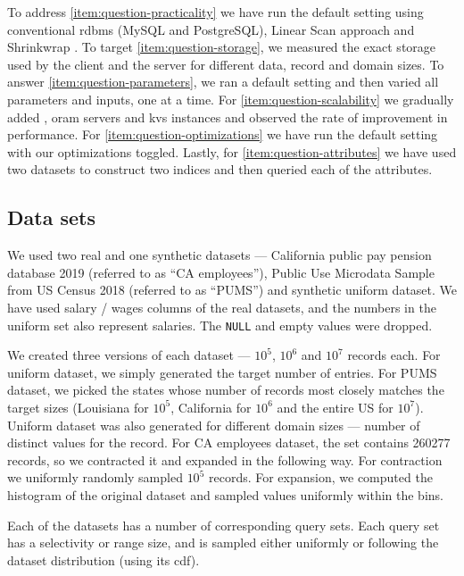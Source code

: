	To address \ref{item:question-practicality} we have run the default setting using conventional \acrshort{rdbms} (MySQL and PostgreSQL), Linear Scan approach and Shrinkwrap \cite{shrinkwrap}. %
	To target \ref{item:question-storage}, we measured the exact storage used by the client and the server for different data, record and domain sizes. %
	To answer \ref{item:question-parameters}, we ran a default setting and then varied all parameters and inputs, one at a time. %
	For \ref{item:question-scalability} we gradually added , \acrshort{oram} servers and \acrshort{kvs} instances and observed the rate of improvement in performance. %
	For \ref{item:question-optimizations} we have run the default setting with our optimizations toggled. %
	Lastly, for \ref{item:question-attributes} we have used two datasets to construct two indices and then queried each of the attributes. %

	\subsection{Data sets}\label{section:range-persistent:experiments:data-sets}

		We used two real and one synthetic datasets --- California public pay pension database 2019 \cite{ca-employees-dataset} (referred to as ``CA employees''), Public Use Microdata Sample from US Census 2018 \cite{pums-dataset} (referred to as ``PUMS'') and synthetic uniform dataset.
		We have used salary / wages columns of the real datasets, and the numbers in the uniform set also represent salaries.
		The \texttt{NULL} and empty values were dropped.

		We created three versions of each dataset --- $10^5$, $10^6$ and $10^7$ records each.
		For uniform dataset, we simply generated the target number of entries.
		For PUMS dataset, we picked the states whose number of records most closely matches the target sizes (Louisiana for $10^5$, California for $10^6$ and the entire US for $10^7$).
		Uniform dataset was also generated for different domain sizes --- number of distinct values for the record.
		For CA employees dataset, the set contains \num{260 277} records, so we contracted it and expanded in the following way.
		For contraction we uniformly randomly sampled $10^5$ records.
		For expansion, we computed the histogram of the original dataset and sampled values uniformly within the bins.

		Each of the datasets has a number of corresponding query sets.
		Each query set has a selectivity or range size, and is sampled either uniformly or following the dataset distribution (using its \acrshort{cdf}).

